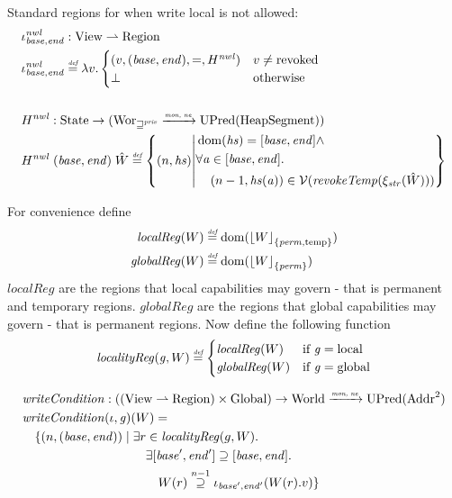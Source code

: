 \documentclass[a4paper]{article}
\DeclarePairedDelimiter\floor{\lfloor}{\rfloor}
\newcommand{\parfun}{\rightharpoonup}
\newcommand{\monnefun}{\xrightarrow{\textit{\tiny{mon, ne}}}}
\newcommand{\fun}{\rightarrow}
\newcommand{\defeq}{\stackrel{\textit{\tiny{def}}}{=}}
\newcommand{\nsupeq}[1][n]{\stackrel{\tiny{#1}}{\supseteq}}
\DeclareMathOperator{\dom}{dom}
\newcommand{\var}[1]{\mathit{#1}}
\newcommand{\hs}{\var{hs}}
\newcommand{\gl}{\var{g}}
\newcommand{\addr}{\var{a}}
\newcommand{\start}{\var{base}}
\newcommand{\addrend}{\var{end}}
\newcommand{\perm}{\var{perm}}
\newcommand{\plainfun}[2]{
  \ifthenelse{\equal{#2}{}}
             {\mathit{#1}}
             {\mathit{#1}(#2)}
}
\newcommand{\writeCond}[1]{\plainfun{writeCondition}{#1}}
\newcommand{\revokeTemp}[1]{\plainfun{revokeTemp}{#1}}
\newcommand{\erase}[2]{\floor*{#1}_{\{#2\}}}
\newcommand{\futurestr}{\mathbin{\sqsupseteq}^{\var{priv}}}
\newcommand{\asmType}{\plaindom{AsmType}}
\newcommand{\plaindom}[1]{\mathrm{#1}}
\newcommand{\Addrs}{\plaindom{Addr}}
\newcommand{\HeapSegments}{\plaindom{HeapSegment}}
\newcommand{\Globals}{\plaindom{Global}}
\newcommand{\States}{\plaindom{State}}
\newcommand{\Regions}{\plaindom{Region}}
\newcommand{\Worlds}{\plaindom{World}}
\newcommand{\Wor}{\plaindom{Wor}}
\newcommand{\Worstr}{\Wor_{\futurestr}}
\newcommand{\xistr}{\xi_{\var{str}}}
\newcommand{\UPred}[1]{\plaindom{UPred}(#1)}
\newcommand{\Views}{\plaindom{View}}
\newcommand{\intr}[2]{\mathcal{#1}}
\newcommand{\valueintr}[1]{\intr{V}{#1}}
\newcommand{\stdvr}{\valueintr{\asmType}}
\newcommand{\npair}[2][n]{\left(#1,#2 \right)}
\newcommand{\plainperm}[1]{\mathrm{#1}}
\newcommand{\local}{\plainperm{local}}
\newcommand{\glob}{\plainperm{global}}
\newcommand{\localReg}{\var{localReg}}
\newcommand{\globalReg}{\var{globalReg}}
\newcommand{\plainview}[1]{\mathrm{#1}}
\newcommand{\temp}{\plainview{temp}}
\newcommand{\revoked}{\plainview{revoked}}
\begin{document}
Standard regions for when write local is not allowed:
\begin{align*}
  &\iota_{\start,\addrend}^{\var{nwl}} : \Views \parfun \Regions \\
  &\iota_{\start,\addrend}^{\var{nwl}} \defeq \lambda v \ldotp
    \begin{cases}
      (v,(\start,\addrend),=,H^{\var{nwl}}) & v \neq \revoked \\
      \bot & \text{otherwise}
\end{cases}
\\ \\
  &H^{\var{nwl}} : \States \fun (\Worstr \monnefun \UPred{\HeapSegments})\\
  &H^{\var{nwl}} \; (\start,\addrend) \;\hat{W} \defeq \left\{\npair{\hs} \middle|
    \begin{aligned}
      &\dom(\hs) = [\start,\addrend] \land \\
      &\forall \addr \in [\start,\addrend] \ldotp \\
      &\quad \npair[n-1]{\hs(\addr)} \in \stdvr(\revokeTemp{\xistr(\hat{W})})
    \end{aligned}
  \right\}
\end{align*}

For convenience define
\begin{align*}
  \localReg(W) & \defeq \dom(\erase{W}{\perm,\temp}) \\
  \globalReg(W) & \defeq \dom(\erase{W}{\perm})
\end{align*}
$\localReg$ are the regions that local capabilities may govern - that is permanent and temporary regions. $\globalReg$ are the regions that global capabilities may govern - that is permanent regions. Now define the following function
\[
  \var{localityReg}(\gl,W) \defeq 
  \begin{cases}
    \localReg(W) & \text{if } \gl = \local \\
    \globalReg(W) & \text{if } \gl = \glob
  \end{cases}
\]

\begin{align*}
    & \writeCond{} : ((\Views \rightharpoonup \Regions) \times \Globals) \fun \Worlds \monnefun \UPred{\Addrs^2}  \\
    & \writeCond{}(\iota,\gl)(W) =  \\
    & \quad \begin{aligned}[t]
              \{ \npair{(\start,\addrend)} \mid & \;\exists r \in \var{localityReg}(g,W) \ldotp \\
              & \;\quad \exists [\start',\addrend'] \supseteq [\start,\addrend] \ldotp \\
              & \;\qquad W(r)\nsupeq[n-1] \iota_{\start',\addrend'}(W(r).v) \}
            \end{aligned}
\end{align*}
\end{document}
